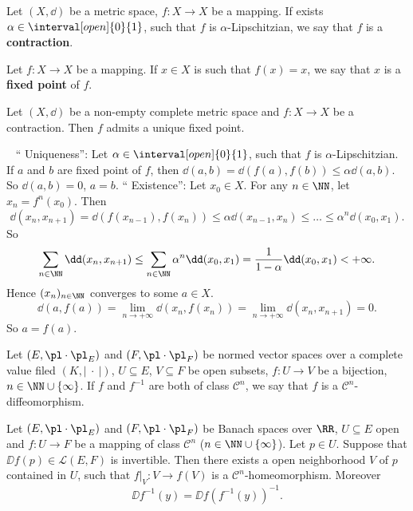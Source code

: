 \begin{definitionenv}
    Let $(X,\dd)$ be a metric space, $f: X\longrightarrow X$ be a mapping. If exists $\alpha\in \interval[open]{0}{1}$, such that $f$ is $\alpha$-Lipschitzian, we say that $f$ is a \textbf{contraction}.
\end{definitionenv}
\begin{definitionenv}
    Let $f:X\longrightarrow X$ be a mapping. If $x\in X$ is such that $f(x)=x$, we say that $x$ is a \textbf{fixed point} of $f$.
\end{definitionenv}
\begin{theoremenv}
    Let $(X,\dd)$ be a non-empty complete metric space and $f: X\longrightarrow X$ be a contraction. Then $f$ admits a unique fixed point.
\end{theoremenv}
\begin{proofenv}
    \ \newline
    `` Uniqueness'': Let $\alpha\in \interval[open]{0}{1}$, such that $f$ is $\alpha$-Lipschitzian. If $a$ and $b$ are fixed point of $f$, then $\dd(a,b)=\dd(f(a),f(b))\le \alpha \dd (a,b)$. 
    So $\dd(a,b)=0$, $a=b$.
    \newline
    `` Existence'': Let $x_0\in X$. For any $n\in \NN$, let $x_n=f^n(x_0)$. Then 
    $$\dd(x_n,x_{n+1})=\dd(f(x_{n-1}),f(x_n))\le \alpha \dd(x_{n-1},x_n)\le \dots\le \alpha^n \dd(x_0,x_1).$$
    So 
    $$ \sum_{n\in \NN} \dd (x_n,x_{n+1})\le \sum_{n\in\NN}\alpha^n \dd(x_0,x_1)=\frac{1}{1-\alpha}\dd (x_0,x_1)<+\infty.$$
    Hence $(x_n)_{n\in \NN}$ converges to some $a\in X$.
    $$ \dd(a,f(a))=\lim_{n\rightarrow +\infty}\dd(x_n,f(x_n))=\lim_{n\rightarrow+\infty}\dd (x_n,x_{n+1})=0.$$
    So $a=f(a)$.
\end{proofenv}
\begin{definitionenv}
    Let $(E,\pl\cdot\pl_E)$ and $(F,\pl\cdot\pl_F)$ be normed vector spaces over a complete value filed $(K,\left|\ \cdot\ \right|)$, $U\subseteq E$, $V\subseteq F$ be open subsets, $f:U\longrightarrow V$ be a bijection, $n\in \NN\cup\{\infty\}$.
    If $f$ and $f^{-1}$ are both of class $\mathcal{C}^{n}$, we say that $f$ is a $\mathcal{C}^{n}$-diffeomorphism.
\end{definitionenv}
\begin{theoremenv}
    Let $(E,\pl\cdot\pl_E)$ and $(F,\pl\cdot\pl_F)$ be Banach spaces over $\RR$, $U\subseteq E$ open and $f:U\longrightarrow F$ be a mapping of class $\mathcal{C}^n$ ($n\in \NN\cup \{\infty\}$).
    Let $p\in U$. Suppose that $\DD f(p)\in \mathscr{L}(E,F)$ is invertible. Then there exists a open neighborhood $V$ of $p$ contained in $U$, such that $f|_{V}:V\longrightarrow f(V)$ is a $\mathcal{C}^n$-homeomorphism. Moreover
    $$ \DD f^{-1}(y)=\DD f(f^{-1}(y))^{-1}.$$
\end{theoremenv}
